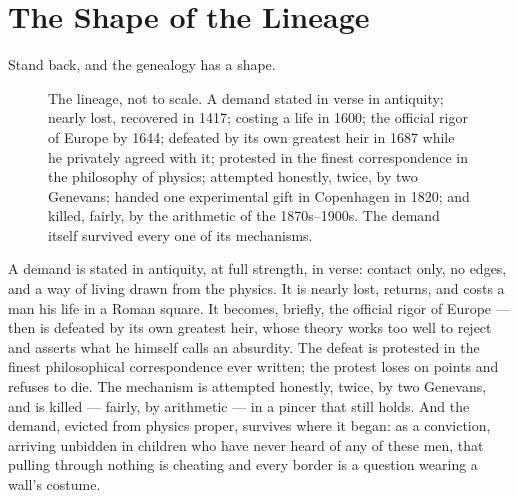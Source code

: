 \documentclass[fontsize=11pt,paper=a4,pagesize=auto,parskip=half-]{scrbook}
\begin{document}
\section{The Shape of the Lineage}

Stand back, and the genealogy has a shape.


\begin{figure}[htbp]
\centering
{}
\caption{The lineage, not to scale. A demand stated in verse in antiquity; nearly lost, recovered in 1417; costing a life in 1600; the official rigor of Europe by 1644; defeated by its own greatest heir in 1687 while he privately agreed with it; protested in the finest correspondence in the philosophy of physics; attempted honestly, twice, by two Genevans; handed one experimental gift in Copenhagen in 1820; and killed, fairly, by the arithmetic of the 1870s--1900s. The demand itself survived every one of its mechanisms.}
\label{fig:lineage}
\end{figure}

A demand is stated in antiquity, at full strength, in verse: contact only, no edges, and a way of living drawn from the physics. It is nearly lost, returns, and costs a man his life in a Roman square. It becomes, briefly, the official rigor of Europe --- then is defeated by its own greatest heir, whose theory works too well to reject and asserts what he himself calls an absurdity. The defeat is protested in the finest philosophical correspondence ever written; the protest loses on points and refuses to die. The mechanism is attempted honestly, twice, by two Genevans, and is killed --- fairly, by arithmetic --- in a pincer that still holds. And the demand, evicted from physics proper, survives where it began: as a conviction, arriving unbidden in children who have never heard of any of these men, that pulling through nothing is cheating and every border is a question wearing a wall's costume.
\end{document}
